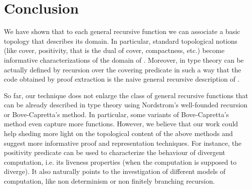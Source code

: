 \documentclass[copyright,creativecommons]{eptcs}
\begin{document}
\section{Conclusion}
We have shown that to each general recursive function  we can associate a
basic topology that describes its domain. In particular, standard topological
notions (like cover, positivity, that is the dual of cover, compactness, etc.)
become informative characterizations of the domain of . Moreover, in
type theory  can be actually defined by recursion over the covering
predicate  in such a way that the code obtained
by proof extraction is the naive general recursive description of .

So far, our technique does not enlarge the class of general recursive functions
that can be already described in type theory using Nordstrom's well-founded
recursion or Bove-Capretta's method. In particular, some variants of Bove-Capretta's 
method even capture more functions. However, we believe that our work could
help sheding more light on the topological content of the above methods and
suggest more informative proof and representation techniques. For instance, the
positivity predicate can be used to characterize the behaviour of divergent
computation, i.e. its liveness properties (when the computation is supposed to
diverge). It also naturally points to the investigation of different models
of computation, like non determinism or non finitely branching recursion.
\end{document}
